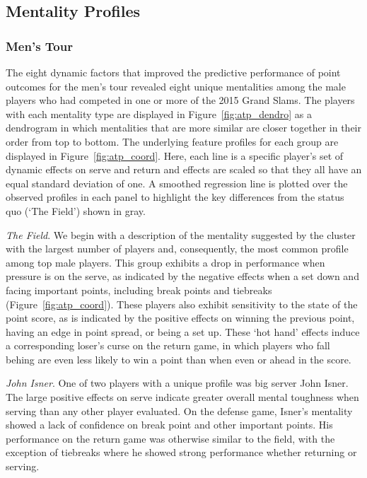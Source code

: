 \documentclass{Latex/svjour3}
\begin{document}
\subsection{Mentality Profiles}

\subsubsection{Men's Tour}

The eight dynamic factors that improved the predictive performance of
point outcomes for the men's tour revealed eight unique mentalities
among the male players who had competed in one or more of the 2015
Grand Slams. The players with each mentality type are displayed in
Figure~\ref{fig:atp_dendro} as a dendrogram in which mentalities that
are more similar are closer together in their order from top to
bottom. The underlying feature profiles for each group are displayed in
Figure~\ref{fig:atp_coord}. Here, each line is a specific player's
set of dynamic effects on serve and return and effects are scaled so
that they all have an equal standard deviation of one. A smoothed
regression line is plotted over the observed profiles in each panel to
highlight the key differences from the status quo (`The Field') shown
in gray.

\textit{The Field}. We begin with a description of the mentality
suggested by the cluster with the largest number of players and,
consequently, the most common profile among top male players. This
group exhibits a drop in performance when pressure is on the serve, as
indicated by the negative effects when a set down and facing important
points, including break points and tiebreaks (Figure~\ref{fig:atp_coord}). These players also
exhibit sensitivity to the state of the point score, as is indicated
by the positive effects on winning the previous point, having an edge
in point spread, or being a set up. These `hot hand' effects induce a
corresponding loser's curse on the return game, in which players who
fall behing are even less likely to win a point than when even or
ahead in the score. 

\textit{John Isner}. One of two players with a unique profile was big
server John Isner. The large positive effects on serve indicate
greater overall mental toughness when serving than any other player
evaluated. On the defense game, Isner's mentality showed a lack of
confidence on break point and other important points. His performance
on the return game was otherwise similar to the field, with the
exception of tiebreaks where he showed strong performance whether
returning or serving. 
\end{document}
